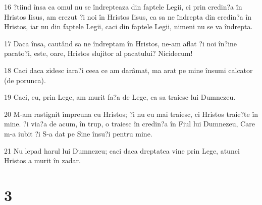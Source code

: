 \par 16 ?tiind însa ca omul nu se îndrepteaza din faptele Legii, ci prin credin?a în Hristos Iisus, am crezut ?i noi în Hristos Iisus, ca sa ne îndrepta din credin?a în Hristos, iar nu din faptele Legii, caci din faptele Legii, nimeni nu se va îndrepta.
\par 17 Daca însa, cautând sa ne îndreptam în Hristos, ne-am aflat ?i noi în?ine pacato?i, este, oare, Hristos slujitor al pacatului? Nicidecum!
\par 18 Caci daca zidesc iara?i ceea ce am darâmat, ma arat pe mine însumi calcator (de porunca).
\par 19 Caci, eu, prin Lege, am murit fa?a de Lege, ca sa traiesc lui Dumnezeu.
\par 20 M-am rastignit împreuna cu Hristos; ?i nu eu mai traiesc, ci Hristos traie?te în mine. ?i via?a de acum, în trup, o traiesc în credin?a în Fiul lui Dumnezeu, Care m-a iubit ?i S-a dat pe Sine însu?i pentru mine.
\par 21 Nu lepad harul lui Dumnezeu; caci daca dreptatea vine prin Lege, atunci Hristos a murit în zadar.

\chapter{3}


